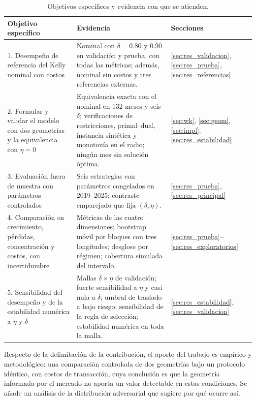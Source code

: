 \begin{table}[htbp]
\centering
\footnotesize
\caption{Objetivos específicos y evidencia con que se atienden.}\label{tab:cumplimiento}
\begin{tabular}{|p{4.2cm}|p{6.6cm}|p{3.6cm}|}
\hline
\textbf{Objetivo específico} & \textbf{Evidencia} & \textbf{Secciones} \\ \hline
1. Desempeño de referencia del Kelly nominal con costos & Nominal con $\delta=0.80$ y $0.90$ en validación y prueba, con todas las métricas; además, nominal sin costos y tres referencias externas. & \ref{sec:res_validacion}, \ref{sec:res_prueba}, \ref{sec:res_referencias} \\ \hline
2. Formular y validar el modelo con dos geometrías y la equivalencia con $\eta=0$ & Equivalencia exacta con el nominal en 132 meses y seis $\delta$; verificaciones de restricciones, primal--dual, instancia sintética y monotonía en el radio; ningún mes sin solución óptima. & \ref{sec:wk}, \ref{sec:geom}, \ref{sec:impl}, \ref{sec:res_estabilidad} \\ \hline
3. Evaluación fuera de muestra con parámetros controlados & Seis estrategias con parámetros congelados en 2019--2025; contraste emparejado que fija $(\delta,\eta)$. & \ref{sec:res_prueba}, \ref{sec:res_principal} \\ \hline
4. Comparación en crecimiento, pérdidas, concentración y costos, con incertidumbre & Métricas de las cuatro dimensiones; bootstrap móvil por bloques con tres longitudes; desglose por régimen; cobertura simulada del intervalo. & \ref{sec:res_prueba}--\ref{sec:res_exploratorios} \\ \hline
5. Sensibilidad del desempeño y de la estabilidad numérica a $\eta$ y $\delta$ & Mallas $\delta\times\eta$ de validación; fuerte sensibilidad a $\eta$ y casi nula a $\delta$; umbral de traslado a bajo riesgo; sensibilidad de la regla de selección; estabilidad numérica en toda la malla. & \ref{sec:res_estabilidad}, \ref{sec:res_validacion} \\ \hline
\end{tabular}
\end{table}

Respecto de la delimitación de la contribución, el aporte del trabajo es empírico y metodológico: una comparación controlada de dos geometrías bajo un protocolo idéntico, con costos de transacción, cuya conclusión es que la geometría informada por el mercado no aporta un valor detectable en estas condiciones. Se añade un análisis de la distribución adversarial que sugiere por qué ocurre así.

